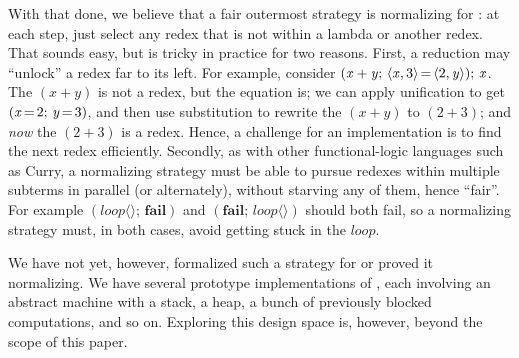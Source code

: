\documentclass[acmsmall]{acmart}
\newcommand{\Varid}[1]{\mathit{#1}}
\newcommand{\ie}{\emph{i.e.}\xspace}	%
\begin{document}
With that done, we believe that a fair outermost strategy is normalizing for
\versecalc{}: at each step, just select any redex that is not within a lambda or another redex.
That sounds easy, but is tricky in practice for two reasons.
First, a reduction may ``unlock'' a redex far to its left.
For example, consider \ensuremath{(\Varid{x}\mathbin{+}\Varid{y};\,\langle{}\Varid{x},\mathrm{3}\rangle\hspace{-0.14em}=\hspace{-0.14em}\langle{}\mathrm{2},\Varid{y}\rangle);\,\Varid{x}}.  The \ensuremath{(\Varid{x}\mathbin{+}\Varid{y})} is not a
redex, but the equation is; we can apply unification to get \ensuremath{(\Varid{x}\hspace{-0.14em}=\hspace{-0.14em}\mathrm{2};\,\Varid{y}\hspace{-0.14em}=\hspace{-0.14em}\mathrm{3})}, and then
use substitution to rewrite the \ensuremath{(\Varid{x}\mathbin{+}\Varid{y})} to \ensuremath{(\mathrm{2}\mathbin{+}\mathrm{3})}; and
\emph{now} the \ensuremath{(\mathrm{2}\mathbin{+}\mathrm{3})} is a redex. Hence, a challenge for an implementation is to
find the next redex efficiently. Secondly, as with other functional-logic languages such as Curry, a normalizing
strategy must be able to pursue redexes within multiple subterms in parallel (or alternately), without starving any of them, hence ``fair''.  For example \ensuremath{(\Varid{loop}\langle\rangle;\,\textbf{fail})}
and \ensuremath{(\textbf{fail};\,\Varid{loop}\langle\rangle)} should both fail, so a normalizing strategy must, in both cases, avoid getting stuck
in the \ensuremath{\Varid{loop}}.

We have not yet, however, formalized such a strategy for \versecalc{} or proved it normalizing.
We have several prototype implementations of \versecalc{}, each involving an abstract
machine with a stack, a heap, a bunch of previously blocked computations, and so on. Exploring this
design space is, however, beyond the scope of this paper.

\end{document}
